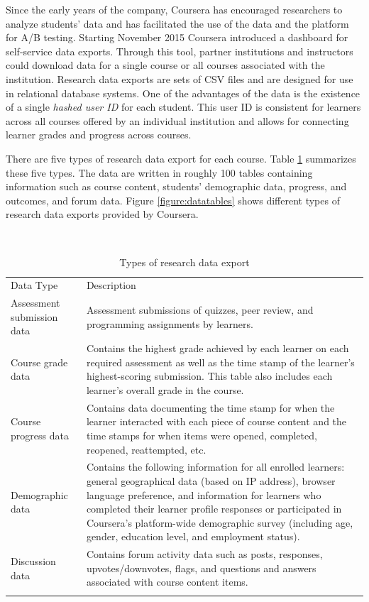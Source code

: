 Since the early years of the company, Coursera has encouraged
researchers to analyze students' data and has facilitated the use of the
data and the platform for A/B testing. Starting November 2015 Coursera
introduced a dashboard for self-service data exports. Through this tool,
partner institutions and instructors could download data for a single
course or all courses associated with the institution. Research data
exports are sets of CSV files and are designed for use in relational
database systems. One of the advantages of the data is the existence of
a single \emph{hashed user ID} for each student. This user ID is
consistent for learners across all courses offered by an individual
institution and allows for connecting learner grades and progress across
courses.

There are five types of research data export for each course. Table
\ref{tab:datatypes} summarizes these five types. The data are written in
roughly 100 tables containing information such as course content,
students' demographic data, progress, and outcomes, and forum data.
Figure \ref{figure:datatables} shows different types of research data
exports provided by Coursera.

\begin{table}
\footnotesize
\caption{Types of research data export}\
\centering
\label{tab:datatypes}
\begin{tabular}{p{4cm}|p{7cm}}
Data Type & Description \\
\addlinespace
\toprule
Assessment submission data & Assessment submissions of quizzes, peer review, and programming assignments by learners.\\
\midrule
Course grade data & Contains the highest grade achieved by each learner on each required assessment as well as the time stamp of the learner's highest-scoring submission. This table also includes each learner's overall grade in the course.\\
\midrule
Course progress data & Contains data documenting the time stamp for when the learner interacted with each piece of course content and the time stamps for when items were opened, completed, reopened, reattempted, etc.\\
\midrule
Demographic data & Contains the following information for all enrolled learners: general geographical data (based on IP address), browser language preference, and information for learners who completed their learner profile responses or participated in Coursera's platform-wide demographic survey (including age, gender, education level, and employment status).\\
\midrule
Discussion data & Contains forum activity data such as posts, responses, upvotes/downvotes, flags, and questions and answers associated with course content items.\\
\addlinespace
\bottomrule
\end{tabular}
\end{table}

